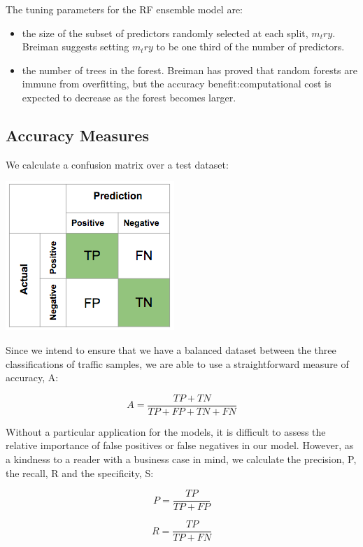 \documentclass[conference]{IEEEtran}
\let\tightlist\relax %
\begin{document}
The tuning parameters for the RF ensemble model are:

\begin{itemize}
\tightlist
\item
  the size of the subset of predictors randomly selected at each split,
  \(m_try\). Breiman suggests setting \(m_try\) to be one third of the
  number of predictors.
\item
  the number of trees in the forest. Breiman has proved that random
  forests are immune from overfitting, but the accuracy
  benefit:computational cost is expected to decrease as the forest
  becomes larger.
\end{itemize}

\subsection{Accuracy Measures}\label{sec:accuracy-measures}

We calculate a confusion matrix over a test dataset:

\begin{center}\includegraphics[width=0.5\linewidth]{confusion_matrix} \end{center}

Since we intend to ensure that we have a balanced dataset between the
three classifications of traffic samples, we are able to use a
straightforward measure of accuracy, A:

\[A = \frac{TP + TN}{TP + FP + TN + FN}\]

Without a particular application for the models, it is difficult to
assess the relative importance of false positives or false negatives in
our model. However, as a kindness to a reader with a business case in
mind, we calculate the precision, P, the recall, R and the specificity,
S:

\[P = \frac{TP}{TP + FP}\]

\[R = \frac{TP}{TP + FN}\]
\end{document}
